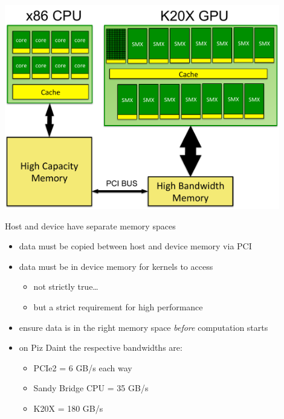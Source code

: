 
\begin{frame}[fragile]{}
    \begin{center}
        \includegraphics[width=0.9\textwidth]{./images/node.pdf}
    \end{center}
\end{frame}

\begin{frame}[fragile]{}
    \begin{info}{Host and device have separate memory spaces}
        \begin{itemize}
            \item data must be copied between host and device memory via PCI
            \item data must be in device memory for kernels to access
                \begin{itemize}
                    \item not strictly true\ldots
                    \item but a strict requirement for high performance
                \end{itemize}
            \item ensure data is in the right memory space \emph{before} computation starts
            \item on Piz Daint the respective bandwidths are:
            \begin{itemize}
                \item PCIe2 = 6 GB/s each way
                \item Sandy Bridge CPU = 35 GB/s
                \item K20X  = 180 GB/s
            \end{itemize}
        \end{itemize}
    \end{info}

\end{frame}

